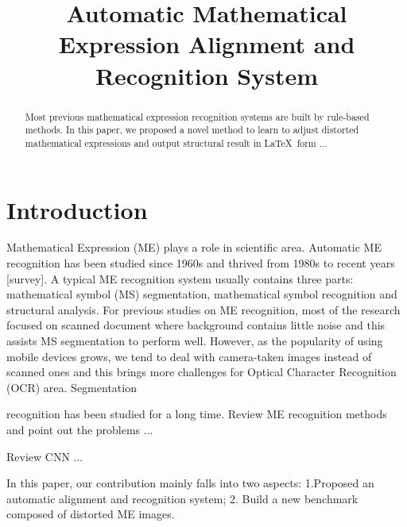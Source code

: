 \documentclass[10pt,conference,a4paper]{IEEEtran}
\begin{document}
	\title{Automatic Mathematical Expression Alignment and Recognition System}
	\author{
	}
	\maketitle
	\begin{abstract}
		Most previous mathematical expression recognition systems are built by rule-based methods. In this paper, we proposed a novel method to learn to adjust distorted mathematical expressions and output structural result in \LaTeX\ form ... 
	\end{abstract}
	
	\IEEEpeerreviewmaketitle
	\section{Introduction}
	Mathematical Expression (ME) plays a role in scientific area. Automatic ME recognition has been studied since 1960s and thrived from 1980s to recent years [survey]. A typical ME recognition system usually contains three parts: mathematical symbol (MS) segmentation, mathematical symbol recognition and structural analysis. For previous studies on ME recognition, most of the research focused on scanned document where background contains little noise and this assists MS segmentation to perform well. However, as the popularity of using mobile devices grows, we tend to deal with camera-taken images instead of scanned ones and this brings more challenges for Optical Character Recognition (OCR) area. Segmentation 
	
	
	recognition has been studied for a long time. 
	Review ME recognition methods and point out the problems ...
		
	Review CNN ...
		
	In this paper, our contribution mainly falls into two aspects: 1.Proposed an automatic alignment and recognition system; 2. Build a new benchmark composed of distorted ME images.
		
\end{document}

